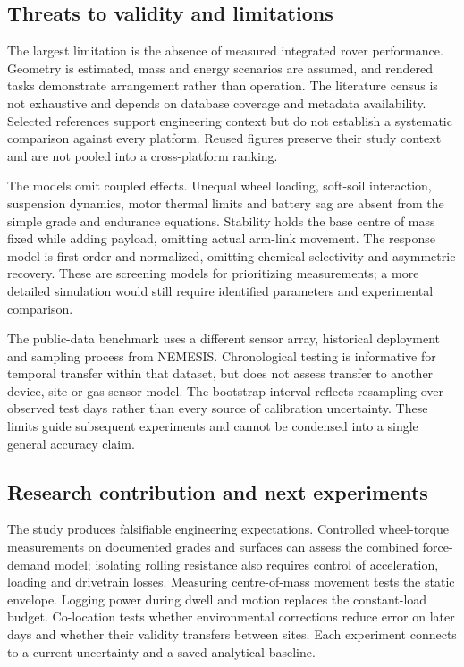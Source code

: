 \documentclass[11pt,a4paper]{article}
\begin{document}
\endgroup

\FloatBarrier

\subsection{Threats to validity and limitations}\label{sec:11.4}

The largest limitation is the absence of measured integrated rover performance. Geometry is estimated, mass and energy scenarios are assumed, and rendered tasks demonstrate arrangement rather than operation. The literature census is not exhaustive and depends on database coverage and metadata availability. Selected references support engineering context but do not establish a systematic comparison against every platform. Reused figures preserve their study context and are not pooled into a cross-platform ranking.

The models omit coupled effects. Unequal wheel loading, soft-soil interaction, suspension dynamics, motor thermal limits and battery sag are absent from the simple grade and endurance equations. Stability holds the base centre of mass fixed while adding payload, omitting actual arm-link movement. The response model is first-order and normalized, omitting chemical selectivity and asymmetric recovery. These are screening models for prioritizing measurements; a more detailed simulation would still require identified parameters and experimental comparison.

The public-data benchmark uses a different sensor array, historical deployment and sampling process from NEMESIS. Chronological testing is informative for temporal transfer within that dataset, but does not assess transfer to another device, site or gas-sensor model. The bootstrap interval reflects resampling over observed test days rather than every source of calibration uncertainty. These limits guide subsequent experiments and cannot be condensed into a single general accuracy claim.

\FloatBarrier

\subsection{Research contribution and next experiments}\label{sec:11.5}

The study produces falsifiable engineering expectations. Controlled wheel-torque measurements on documented grades and surfaces can assess the combined force-demand model; isolating rolling resistance also requires control of acceleration, loading and drivetrain losses. Measuring centre-of-mass movement tests the static envelope. Logging power during dwell and motion replaces the constant-load budget. Co-location tests whether environmental corrections reduce error on later days and whether their validity transfers between sites. Each experiment connects to a current uncertainty and a saved analytical baseline.
\end{document}
